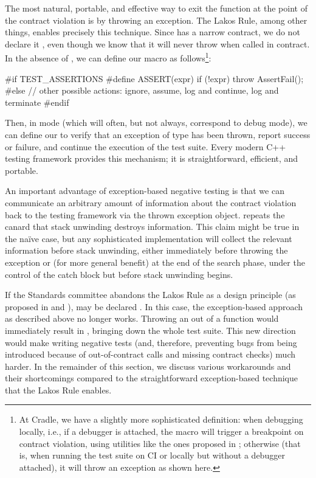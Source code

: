 The most natural, portable, and effective way to exit the function at the point of the contract violation is by throwing an exception. The Lakos Rule, among other things, enables precisely this technique. Since  has a narrow contract, we do not declare it , even though we know that it will never throw when called in contract. In the absence of , we can define our  macro as follows\footnote{At Cradle, we have a slightly more sophisticated definition: when debugging locally, i.e., if a debugger is attached, the  macro will trigger a breakpoint on contract violation, using utilities like the ones proposed in \cite{P2514R0}; otherwise (that is, when running the test suite on CI or locally but without a debugger attached), it will throw an  exception as shown here.}:
\begin{codeblock}
#if TEST_ASSERTIONS
  #define ASSERT(expr) if (!expr) throw AssertFail();
#else
  // other possible actions: ignore, assume, log and continue, log and terminate
#endif
\end{codeblock}
Then, in  mode (which will often, but not always, correspond to debug mode), we can define our  to verify that an exception of type  has been thrown, report success or failure, and continue the execution of the test suite. Every modern C++ testing framework provides this mechanism; it is straightforward, efficient, and portable.

An important advantage of exception-based negative testing is that we can communicate an arbitrary amount of information about the contract violation back to the testing framework via the thrown exception object. \cite{P1656R2} repeats the canard that stack unwinding destroys information. This claim might be true in the na\" ive case, but any sophisticated implementation will collect the relevant information before stack unwinding, either immediately before throwing the exception or (for more general benefit) at the end of the search phase, under the control of the catch block but before stack unwinding begins.

If the Standards committee abandons the Lakos Rule as a design principle (as proposed in \cite{P1656R2} and \cite{P2148R0}),  may be declared . In this case, the exception-based approach as described above no longer works. Throwing an  out of a  function would immediately result in , bringing down the whole test suite. This new direction would make writing negative tests (and, therefore, preventing bugs from being introduced because of out-of-contract calls and missing contract checks) much harder. In the remainder of this section, we discuss various workarounds and their shortcomings compared to the straightforward exception-based technique that the Lakos Rule enables.

